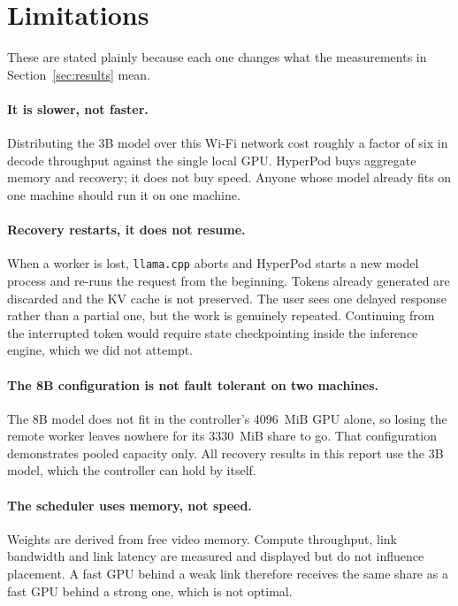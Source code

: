 \section{Limitations}
\label{sec:limitations}

These are stated plainly because each one changes what the measurements in
Section~\ref{sec:results} mean.

\paragraph{It is slower, not faster.}
Distributing the 3B model over this Wi-Fi network cost roughly a factor of six
in decode throughput against the single local GPU. HyperPod buys aggregate
memory and recovery; it does not buy speed. Anyone whose model already fits on
one machine should run it on one machine.

\paragraph{Recovery restarts, it does not resume.}
When a worker is lost, \texttt{llama.cpp} aborts and HyperPod starts a new
model process and re-runs the request from the beginning. Tokens already
generated are discarded and the KV cache is not preserved. The user sees one
delayed response rather than a partial one, but the work is genuinely repeated.
Continuing from the interrupted token would require state checkpointing inside
the inference engine, which we did not attempt.

\paragraph{The 8B configuration is not fault tolerant on two machines.}
The 8B model does not fit in the controller's \SI{4096}{MiB} GPU alone, so
losing the remote worker leaves nowhere for its \SI{3330}{MiB} share to go.
That configuration demonstrates pooled capacity only. All recovery results in
this report use the 3B model, which the controller can hold by itself.

\paragraph{The scheduler uses memory, not speed.}
Weights are derived from free video memory. Compute throughput, link bandwidth
and link latency are measured and displayed but do not influence placement. A
fast GPU behind a weak link therefore receives the same share as a fast GPU
behind a strong one, which is not optimal.

